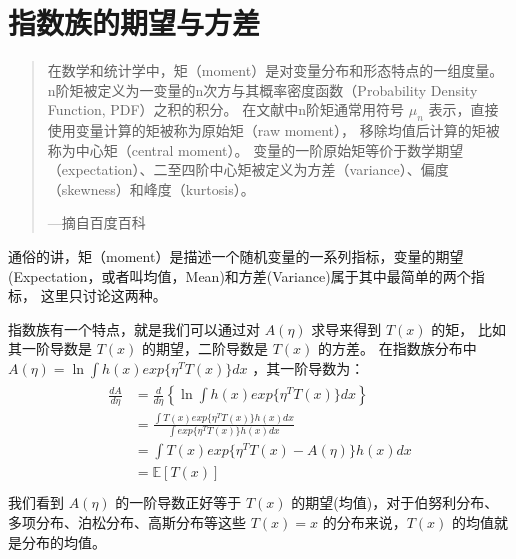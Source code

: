 \documentclass[letterpaper,10pt,english]{sphinxmanual}
\begin{document}
\section{指数族的期望与方差}
\label{\detokenize{_u6307_u6570_u65cf/content:ch-24-moments}}\label{\detokenize{_u6307_u6570_u65cf/content:id8}}\begin{quote}

在数学和统计学中，矩（moment）是对变量分布和形态特点的一组度量。
n阶矩被定义为一变量的n次方与其概率密度函数（Probability Density Function, PDF）之积的积分。
在文献中n阶矩通常用符号 \(\mu_n\) 表示，直接使用变量计算的矩被称为原始矩（raw moment），
移除均值后计算的矩被称为中心矩（central moment）。
变量的一阶原始矩等价于数学期望（expectation）、二至四阶中心矩被定义为方差（variance）、偏度（skewness）和峰度（kurtosis）。

\begin{flushright}
---摘自百度百科
\end{flushright}
\end{quote}

通俗的讲，矩（moment）是描述一个随机变量的一系列指标，变量的期望(Expectation，或者叫均值，Mean)和方差(Variance)属于其中最简单的两个指标，
这里只讨论这两种。

指数族有一个特点，就是我们可以通过对 \(A(\eta)\) 求导来得到 \(T(x)\) 的矩，
比如其一阶导数是 \(T(x)\) 的期望，二阶导数是 \(T(x)\) 的方差。
在指数族分布中 \(A(\eta) = \mathop{\ln} \int h(x) exp\{ \eta^T T(x) \} dx\)
，其一阶导数为：
\begin{align}\label{equation:指数族/content:eq_24_10}\!\begin{aligned}
\frac{d A}{d \eta} &= \frac{d}{d \eta} \left \{
\mathop{\ln}  \int h(x) exp\{ \eta^T T(x) \} dx   \right \}\\
&= \frac{  \int T(x) exp\{ \eta^T T(x) \}h(x)dx    }
{    \int  exp\{ \eta^T T(x) \}h(x)dx   }\\
&= \int T(x) exp \{ \eta^T T(x) - A(\eta)    \} h(x) dx\\
&= \mathbb{E}[T(x)]\\
\end{aligned}\end{align}
我们看到 \(A(\eta)\) 的一阶导数正好等于 \(T(x)\) 的期望(均值)，对于伯努利分布、多项分布、泊松分布、高斯分布等这些
\(T(x)=x\) 的分布来说，\(T(x)\) 的均值就是分布的均值。
\end{document}
